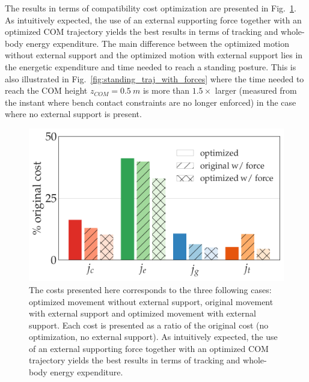\documentclass[12pt,a4paper,twoside]{article}
\begin{document}
The results in terms of compatibility cost optimization are presented in Fig.~\ref{fig:standing_w_forces_costs}. As intuitively expected, the use of an external supporting force together with an optimized COM trajectory yields the best results in terms of tracking and whole-body energy expenditure. The main difference between the optimized motion without external support and the optimized motion with external support lies in the energetic expenditure and time needed to reach a standing posture. This is also illustrated in Fig.~\ref{fig:standing_traj_with_forces} where the time needed to reach the COM height $z_{COM} = 0.5~m$ is more than $1.5\times$ larger (measured from the instant where bench contact constraints are no longer enforced) in the case where no external support is present.

\begin{figure}[!h]
	\begin{minipage}[c]{0.6\textwidth}
	\centering
    \includegraphics[width=\textwidth, trim={0cm 0.5cm 0cm 0cm}, clip]{with_forces/standing_costs}
  	\end{minipage}\hfill
  \begin{minipage}[c]{0.37\textwidth}
      \setlength{\belowcaptionskip}{-12pt}
    \caption{The costs presented here corresponds to the three following cases: optimized movement without external support, original movement with external support and optimized movement with external support. Each cost is presented as a ratio of the original cost (no optimization, no external support). As intuitively expected, the use of an external supporting force together with an optimized COM trajectory yields the best results in terms of tracking and whole-body energy expenditure.}
    \label{fig:standing_w_forces_costs}
  \end{minipage}
\end{figure}
\end{document}
